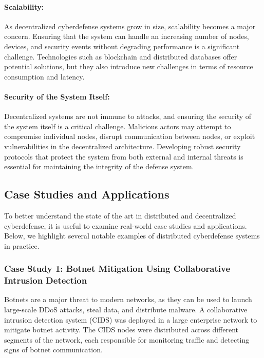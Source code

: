 \paragraph{Scalability:}
As decentralized cyberdefense systems grow in size, scalability becomes a major concern. Ensuring that the system can handle an increasing number of nodes, devices, and security events without degrading performance is a significant challenge. Technologies such as blockchain and distributed databases offer potential solutions, but they also introduce new challenges in terms of resource consumption and latency.

\paragraph{Security of the System Itself:}
Decentralized systems are not immune to attacks, and ensuring the security of the system itself is a critical challenge. Malicious actors may attempt to compromise individual nodes, disrupt communication between nodes, or exploit vulnerabilities in the decentralized architecture. Developing robust security protocols that protect the system from both external and internal threats is essential for maintaining the integrity of the defense system.

\subsection{Case Studies and Applications}

To better understand the state of the art in distributed and decentralized cyberdefense, it is useful to examine real-world case studies and applications. Below, we highlight several notable examples of distributed cyberdefense systems in practice.

\subsubsection{Case Study 1: Botnet Mitigation Using Collaborative Intrusion Detection}

Botnets are a major threat to modern networks, as they can be used to launch large-scale DDoS attacks, steal data, and distribute malware. A collaborative intrusion detection system (CIDS) was deployed in a large enterprise network to mitigate botnet activity. The CIDS nodes were distributed across different segments of the network, each responsible for monitoring traffic and detecting signs of botnet communication.

